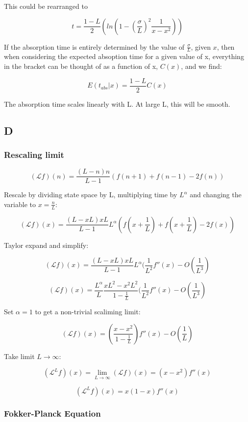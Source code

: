 \documentclass{article}
\begin{document}
This could be rearranged to

$$t = \frac{1-L}{2}(ln(1-(\frac{\sigma}{L})^2\frac{1}{x-x^2}))$$

If the absorption time is entirely determined by the value of $\frac{\sigma}{L}$, given $x$, then when considering the expected absoption time for a given value of x, everything in the bracket can be thought of as a function of x, $C(x)$, and we find:

$$E(t_{abs}|x) = \frac{1-L}{2}C(x)$$

The absorption time scales linearly with L. At large L, this will be smooth.


\subsection{D}

\subsubsection{Rescaling limit}

$$(\mathcal{L}f)(n) = \frac{(L-n)n}{L-1}(f(n+1) + f(n-1) - 2f(n))$$

Rescale by dividing state space by L, multiplying time by $L^\alpha$ and changing the variable to $x=\frac{n}{L}$:

$$(\mathcal{L}f)(x) = \frac{(L-xL)xL}{L-1}L^\alpha(f(x+\frac{1}{L}) + f(x+\frac{1}{L}) - 2f(x))$$

Taylor expand and simplify:

$$(\mathcal{L}f)(x) = \frac{(L-xL)xL}{L-1}L^\alpha(\frac{1}{L^2}f''(x) - O(\frac{1}{L^3})$$

$$(\mathcal{L}f)(x) = \frac{L^\alpha}{L} \frac{xL^2 - x^2L^2}{1-\frac{1}{L}}(\frac{1}{L^2}f''(x) - O(\frac{1}{L^3})$$

Set $\alpha=1$ to get a non-trivial scaliming limit:

$$(\mathcal{L}f)(x) = (\frac{x - x^2}{1-\frac{1}{L}})f''(x) - O(\frac{1}{L})$$

Take limit $L \to \infty$:

$$(\mathcal{L}^Lf)(x) = \lim_{L \to \infty} (\mathcal{L}f)(x) = (x - x^2)f''(x)$$

$$(\mathcal{L}^Lf)(x) = x(1 - x)f''(x)$$

\subsubsection{Fokker-Planck Equation}
\end{document}
